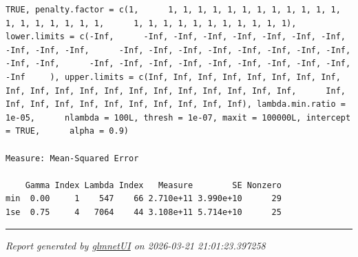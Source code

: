 \documentclass[
]{article}
\begin{document}
\begin{verbatim}
TRUE, penalty.factor = c(1,      1, 1, 1, 1, 1, 1, 1, 1, 1, 1, 1, 1, 1, 1, 1, 1, 1, 1, 1,      1, 1, 1, 1, 1, 1, 1, 1, 1, 1, 1), lower.limits = c(-Inf,      -Inf, -Inf, -Inf, -Inf, -Inf, -Inf, -Inf, -Inf, -Inf, -Inf,      -Inf, -Inf, -Inf, -Inf, -Inf, -Inf, -Inf, -Inf, -Inf, -Inf,      -Inf, -Inf, -Inf, -Inf, -Inf, -Inf, -Inf, -Inf, -Inf, -Inf     ), upper.limits = c(Inf, Inf, Inf, Inf, Inf, Inf, Inf, Inf,      Inf, Inf, Inf, Inf, Inf, Inf, Inf, Inf, Inf, Inf, Inf, Inf,      Inf, Inf, Inf, Inf, Inf, Inf, Inf, Inf, Inf, Inf, Inf), lambda.min.ratio = 1e-05,      nlambda = 100L, thresh = 1e-07, maxit = 100000L, intercept = TRUE,      alpha = 0.9) 

Measure: Mean-Squared Error 

    Gamma Index Lambda Index   Measure        SE Nonzero
min  0.00     1    547    66 2.710e+11 3.990e+10      29
1se  0.75     4   7064    44 3.108e+11 5.714e+10      25
\end{verbatim}

\begin{center}\rule{0.5\linewidth}{0.5pt}\end{center}

\emph{Report generated by
\href{https://github.com/wcraytor/glmnetUI}{glmnetUI} on 2026-03-21
21:01:23.397258}
\end{document}
